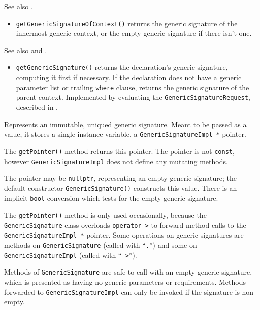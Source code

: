 \documentclass[../generics]{subfiles}
\begin{document}
See also .
\begin{itemize}
\item \texttt{getGenericSignatureOfContext()} returns the generic signature of the innermost generic context, or the empty generic signature if there isn't one.
\end{itemize}

See also  and .
\begin{itemize}
\item \texttt{getGenericSignature()} returns the declaration's generic signature, computing it first if necessary. If the declaration does not have a generic parameter list or trailing \texttt{where} clause, returns the generic signature of the parent context. Implemented by evaluating the \texttt{GenericSignatureRequest}, described in .
\end{itemize}

Represents an immutable, uniqued generic signature. Meant to be passed as a value, it stores a single instance variable, a \texttt{GenericSignatureImpl *} pointer.

The \texttt{getPointer()} method returns this pointer. The pointer is not \texttt{const}, however \texttt{GenericSignatureImpl} does not define any mutating methods.

The pointer may be \texttt{nullptr}, representing an empty generic signature; the default constructor \texttt{GenericSignature()} constructs this value. There is an implicit \texttt{bool} conversion which tests for the empty generic signature.

The \texttt{getPointer()} method is only used occasionally, because the \texttt{GenericSignature} class overloads \texttt{operator->} to forward method calls to the \texttt{GenericSignatureImpl *} pointer. Some operations on generic signatures are methods on \texttt{GenericSignature} (called with ``\texttt{.}'') and some on \texttt{GenericSignatureImpl} (called with ``\texttt{->}'').

Methods of \texttt{GenericSignature} are safe to call with an empty generic signature, which is presented as having no generic parameters or requirements. Methods forwarded to \texttt{GenericSignatureImpl} can only be invoked if the signature is non-empty.
\end{document}
